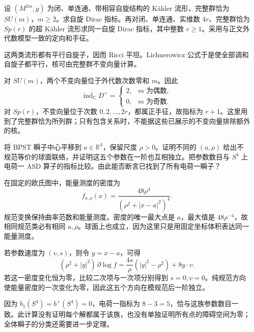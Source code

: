 \begin{exercise}\label{g3:ex:B-special-holonomy-indices}
 设 \((M^{2m},g)\) 为闭、单连通、带相容自旋结构的 Kähler 流形，完整群恰为 \(SU(m)\)，\(m\ge2\)。求自旋 Dirac 指标。再对闭、单连通、实维数 \(4r\)、完整群恰为 \(Sp(r)\) 的超 Kähler 流形求同一自旋 Dirac 指标，其中整数 \(r\ge1\)。采用与正文外代数模型一致的定向和手征。
\end{exercise}
\begin{solution}
 这两类流形都有平行自旋子，因而 Ricci 平坦。Lichnerowicz 公式于是使全部调和自旋子都平行，核可由完整群不变向量计算。

 对 \(SU(m)\)，两个不变向量位于外代数次数零和 \(m\)。因此
 \[
  \operatorname{ind}_{\mathbb C}D^+
     =\begin{cases}2,&m\text{ 为偶数},\\0,&m\text{ 为奇数}.
       \end{cases}
 \]
 对 \(Sp(r)\)，不变向量位于次数 \(0,2,\ldots,2r\)，都属正手征，故指标为 \(r+1\)。这里用到了完整群恰为所列群；只有包含关系时，不能据这些已展示的不变向量排除额外的核。
\end{solution}

\begin{exercise}\label{g3:ex:B-instanton-five-parameters}
 将 BPST 瞬子中心平移到 \(a\in\mathbb R^4\)，保留尺度 \(\rho>0\)。证明不同的 \((a,\rho)\) 给出不规范等价的球面联络，并证明这五个参数在一阶也互相独立。把参数数目与 \(S^4\) 上电荷一 ASD 算子的指标比较。由此能否断言已找到了所有电荷一瞬子？
\end{exercise}
\begin{solution}
 在固定的欧氏图中，能量测度的密度为
 \[
  f_{a,\rho}(x)=\frac{48\rho^4}{(\rho^2+|x-a|^2)^4}.
 \]
 规范变换保持曲率范数和能量测度。密度的唯一最大点是 \(a\)，最大值是 \(48\rho^{-4}\)，故相同规范类必有相同 \(a,\rho\)。球面上也成立，因为这里只是用固定坐标体积表达同一能量测度。

 若参数速度为 \((v,s)\)，则令 \(y=x-a\)，可得
 \[
  (\rho^2+|y|^2)\,\partial\log f
    =\frac{4s}{\rho}(|y|^2-\rho^2)+8y\cdot v.
 \]
 若这一密度变化恒为零，比较二次项与一次项分别得到 \(s=0,v=0\)。纯规范方向使能量密度的一次变化为零，因此这五个方向在模规范后一阶独立。

 因为 \(b_1(S^4)=b^+(S^4)=0\)，电荷一指标为 \(8-3=5\)，恰与这族参数数目一致。此计算没有证明每个解都属于该族，也没有单独证明所有点的障碍空间为零；全体瞬子的分类还需要进一步定理。
\end{solution}

